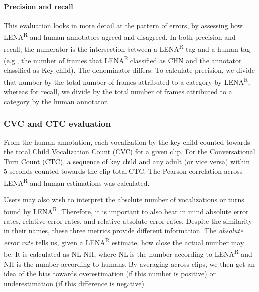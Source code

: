\documentclass[english,table,man,floatsintext]{apa6}
\let\oldparagraph\paragraph
\renewcommand{\paragraph}[1]{\oldparagraph{#1}\mbox{}}
\begin{document}
\hypertarget{precision-and-recall}{%
\paragraph{Precision and recall}\label{precision-and-recall}}

This evaluation looks in more detail at the pattern of errors, by assessing how LENA\textsuperscript{R} and human annotators agreed and disagreed. In both precision and recall, the numerator is the intersection between a LENA\textsuperscript{R} tag and a human tag (e.g., the number of frames that LENA\textsuperscript{R} classified as CHN and the annotator classified as Key child). The denominator differs: To calculate precision, we divide that number by the total number of frames attributed to a category by LENA\textsuperscript{R}, whereas for recall, we divide by the total number of frames attributed to a category by the human annotator.

\hypertarget{cvc-and-ctc-evaluation}{%
\subsubsection{CVC and CTC evaluation}\label{cvc-and-ctc-evaluation}}

From the human annotation, each vocalization by the key child counted towards the total Child Vocalization Count (CVC) for a given clip. For the Conversational Turn Count (CTC), a sequence of key child and any adult (or vice versa) within 5 seconds counted towards the clip total CTC. The Pearson correlation across LENA\textsuperscript{R} and human estimations was calculated.

Users may also wish to interpret the absolute number of vocalizations or turns found by LENA\textsuperscript{R}. Therefore, it is important to also bear in mind absolute error rates, relative error rates, and relative absolute error rates. Despite the similarity in their names, these three metrics provide different information. The \emph{absolute error rate} tells us, given a LENA\textsuperscript{R} estimate, how close the actual number may be. It is calculated as NL-NH, where NL is the number according to LENA\textsuperscript{R} and NH is the number according to humans. By averaging across clips, we then get an idea of the bias towards overestimation (if this number is positive) or underestimation (if this difference is negative).
\end{document}
